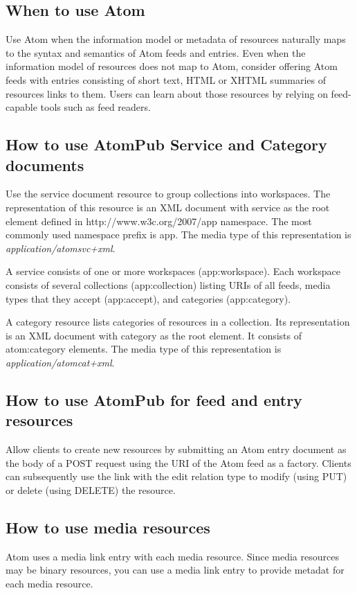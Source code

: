 \documentclass[11pt,a4paper]{article}
\begin{document}
\subsection{When to use Atom}
Use Atom when the information model or metadata of resources naturally maps to the syntax and semantics of Atom feeds and entries. Even when the information model of resources does not map to Atom, consider offering Atom feeds with entries consisting of short text, HTML or XHTML summaries of resources links to them. Users can learn about those resources by relying on feed-capable tools such as feed readers.

\subsection{How to use AtomPub Service and Category documents}
Use the service document resource to group collections into workspaces. The representation of this resource is an XML document with service as the root element defined in http://www.w3c.org/2007/app namespace. The most commonly used namespace prefix is app. The media type of this representation is \textit{application/atomsvc+xml}. 

A service consists of one or more workspaces (app:workspace). Each workspace consists of several collections (app:collection) listing URIs of all feeds, media types that they accept (app:accept), and categories (app:category).

A category resource lists categories of resources in a collection. Its representation is an XML document with category as the root element. It consists of atom:category elements. The media type of this representation is \textit{application/atomcat+xml}.

\subsection{How to use AtomPub for feed and entry resources}
Allow clients to create new resources by submitting an Atom entry document as the body of a POST request using the URI of the Atom feed as a factory. Clients can subsequently use the link with the edit relation type to modify (using PUT) or delete (using DELETE) the resource.

\subsection{How to use media resources}
Atom uses a media link entry with each media resource. Since media resources may be binary resources, you can use a media link entry to provide metadat for each media resource.
\end{document}
